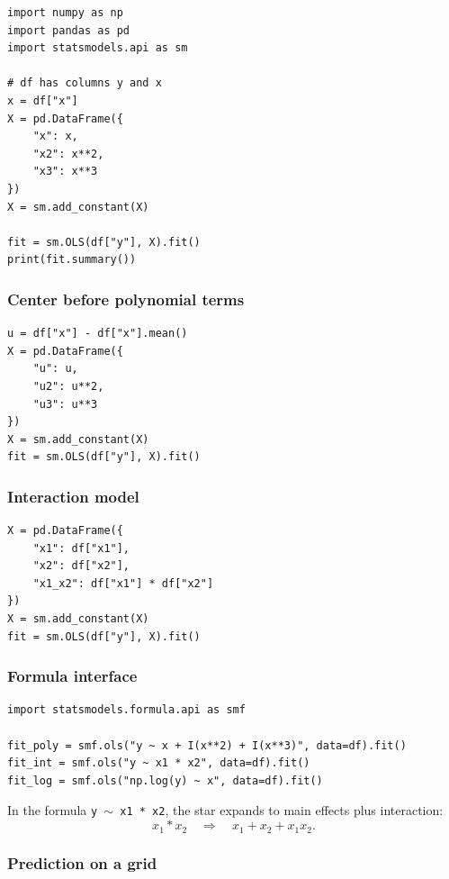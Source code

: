 \begin{verbatim}
import numpy as np
import pandas as pd
import statsmodels.api as sm

# df has columns y and x
x = df["x"]
X = pd.DataFrame({
    "x": x,
    "x2": x**2,
    "x3": x**3
})
X = sm.add_constant(X)

fit = sm.OLS(df["y"], X).fit()
print(fit.summary())
\end{verbatim}

\subsubsection*{Center before polynomial terms}

\begin{verbatim}
u = df["x"] - df["x"].mean()
X = pd.DataFrame({
    "u": u,
    "u2": u**2,
    "u3": u**3
})
X = sm.add_constant(X)
fit = sm.OLS(df["y"], X).fit()
\end{verbatim}

\subsubsection*{Interaction model}

\begin{verbatim}
X = pd.DataFrame({
    "x1": df["x1"],
    "x2": df["x2"],
    "x1_x2": df["x1"] * df["x2"]
})
X = sm.add_constant(X)
fit = sm.OLS(df["y"], X).fit()
\end{verbatim}

\subsubsection*{Formula interface}

\begin{verbatim}
import statsmodels.formula.api as smf

fit_poly = smf.ols("y ~ x + I(x**2) + I(x**3)", data=df).fit()
fit_int = smf.ols("y ~ x1 * x2", data=df).fit()
fit_log = smf.ols("np.log(y) ~ x", data=df).fit()
\end{verbatim}

In the formula \texttt{y \(\sim\) x1 * x2}, the star expands to main effects plus interaction:
\begin{equation}
  x_1*x_2 \quad\Longrightarrow\quad x_1+x_2+x_1x_2.
\end{equation}

\subsubsection*{Prediction on a grid}

